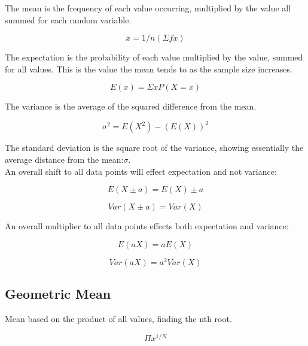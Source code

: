 \documentclass[11pt]{scrartcl} %
\begin{document}
The mean is the frequency of each value occurring, multiplied by the
value all summed for each random variable.

\begin{equation}
	\overline{x} = 1/n(\Sigma fx)
\end{equation}

The expectation is the probability of each value multiplied by the
value, summed for all values. This is the value the mean tends to as the
sample size increases.

\begin{equation}
	E(x) = \Sigma x P(X=x)
\end{equation}

The variance is the average of the squared difference from the mean.

\begin{equation}
	\sigma^2 = E(X^2) - (E(X))^2
\end{equation}

The standard deviation is the square root of the variance, showing
essentially the average distance from the mean:\(\sigma\). \\

An overall shift to all data points will effect expectation and not
variance:

\begin{equation}
	E(X \pm a) = E(X) \pm a
\end{equation}

\begin{equation}
	Var(X \pm a) = Var(X)
\end{equation}

An overall multiplier to all data points effects both expectation and
variance:

\begin{equation}
	E(aX) = aE(X)
\end{equation}

\begin{equation}
	Var(aX) = a^2Var(X)
\end{equation}

\subsection{Geometric Mean}

Mean based on the product of all values, finding the nth root.

\begin{equation}
	\Pi{x}^{1/N}
\end{equation}
\end{document}
